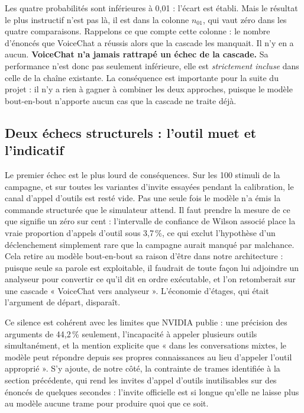 \documentclass[11pt,a4paper]{article}
\begin{document}
Les quatre probabilités sont inférieures à 0,01 : l'écart est établi. Mais le
résultat le plus instructif n'est pas là, il est dans la colonne $n_{01}$, qui
vaut zéro dans les quatre comparaisons. Rappelons ce que compte cette colonne :
le nombre d'énoncés que VoiceChat a réussis alors que la cascade les manquait.
Il n'y en a aucun. \textbf{VoiceChat n'a jamais rattrapé un échec de la
cascade.} Sa performance n'est donc pas seulement inférieure, elle est
\emph{strictement incluse} dans celle de la chaîne existante. La conséquence est
importante pour la suite du projet : il n'y a rien à gagner à combiner les deux
approches, puisque le modèle bout-en-bout n'apporte aucun cas que la cascade ne
traite déjà.

\subsection{Deux échecs structurels : l'outil muet et l'indicatif}
\label{sec:outils}

Le premier échec est le plus lourd de conséquences. Sur les 100 stimuli de la
campagne, et sur toutes les variantes d'invite essayées pendant la calibration,
le canal d'appel d'outils est resté vide. Pas une seule fois le modèle n'a émis
la commande structurée que le simulateur attend. Il faut prendre la mesure de ce
que signifie un zéro sur cent : l'intervalle de confiance de Wilson associé
place la vraie proportion d'appels d'outil sous 3,7\,\%, ce qui exclut
l'hypothèse d'un déclenchement simplement rare que la campagne aurait manqué par
malchance. Cela retire au modèle
bout-en-bout sa raison d'être dans notre architecture : puisque seule sa parole
est exploitable, il faudrait de toute façon lui adjoindre un analyseur pour
convertir ce qu'il dit en ordre exécutable, et l'on retomberait sur une cascade
« VoiceChat vers analyseur ». L'économie d'étages, qui était l'argument de
départ, disparaît.

Ce silence est cohérent avec les limites que NVIDIA publie : une précision des
arguments de 44,2\,\% seulement, l'incapacité à appeler plusieurs outils
simultanément, et la mention explicite que « dans les conversations mixtes, le
modèle peut répondre depuis ses propres connaissances au lieu d'appeler l'outil
approprié ». S'y ajoute, de notre côté, la contrainte de trames identifiée à la
section précédente, qui rend les invites d'appel d'outils inutilisables sur des
énoncés de quelques secondes : l'invite officielle est si longue qu'elle ne
laisse plus au modèle aucune trame pour produire quoi que ce soit.
\end{document}
